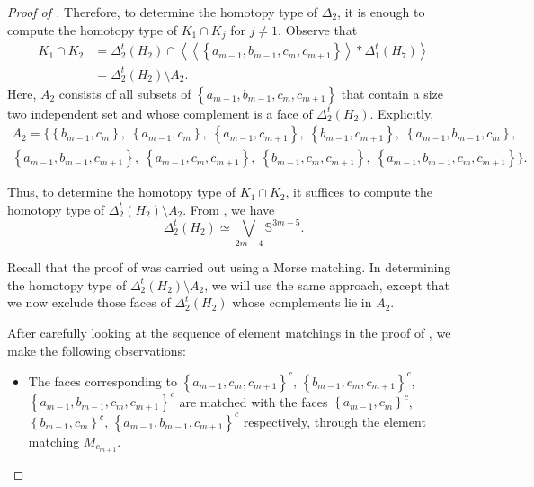 \documentclass[11pt,reqno,a4paper]{amsart}
\theoremstyle{definition}
\theoremstyle{theorem}
\newcommand{\lno}{\left(}
\newcommand{\rno}{\right)}
\newcommand{\lcu}{\left\{}
\newcommand{\rcu}{\right\}}
\newcommand{\bbS}{\mathbb{S}}
\theoremstyle{remark}
\begin{document}
\begin{proof}[Proof of ]
Therefore, to determine the homotopy type of $\Delta_2$, it is enough to compute the homotopy type of $K_1 \cap K_j$ for $j \neq 1$. Observe that
\begin{align*}
    K_1 \cap K_2
        &= \Delta_2^t \lno H_2 \rno
           \cap 
           \left\langle 
               \left\langle 
                   \lcu a_{m-1}, b_{m-1}, c_m, c_{m+1} \rcu 
               \right\rangle 
               * \Delta_1^t \lno H_7 \rno
           \right\rangle \\
        &= \Delta_2^t \lno H_2 \rno \setminus A_2.
\end{align*}
Here, $A_2$ consists of all subsets of $ \lcu a_{m-1}, b_{m-1}, c_m, c_{m+1} \rcu $ that contain a size two independent set and whose complement is a face of $\Delta_2^t \lno H_2 \rno$. Explicitly,
\begin{align*}
    A_2 = \Big\{
        \lcu b_{m-1}, c_m \rcu,\;
         \lcu a_{m-1}, c_m \rcu,\;
         \lcu a_{m-1}, c_{m+1} \rcu,\;
         \lcu b_{m-1}, c_{m+1} \rcu,\;
        \lcu a_{m-1}, b_{m-1}, c_m \rcu,\\
         \lcu a_{m-1}, b_{m-1}, c_{m+1} \rcu,\;
         \lcu a_{m-1}, c_m, c_{m+1} \rcu,\;
        \lcu b_{m-1}, c_m, c_{m+1} \rcu,\;
         \lcu a_{m-1}, b_{m-1}, c_m, c_{m+1} \rcu
    \Big\}.
\end{align*}

Thus, to determine the homotopy type of $K_1 \cap K_2$, it suffices to compute the homotopy type of $\Delta_2^t \lno H_2 \rno \setminus A_2$. From , we have
\[
    \Delta_2^t \lno H_2 \rno \simeq \bigvee\limits_{2m-4} \bbS^{3m-5}.
\]

Recall that the proof of  was carried out using a Morse matching. In determining the homotopy type of $\Delta_2^t \lno H_2 \rno \setminus A_2$, we will use the same approach, except that we now exclude those faces of $\Delta_2^t \lno H_2 \rno$ whose complements lie in $A_2$.

After carefully looking at the sequence of element matchings in the proof of , we make the following observations:
\begin{itemize}
    \item The faces corresponding to $\lcu a_{m-1},c_{m},c_{m+1}\rcu^c$, $\lcu b_{m-1},c_{m},c_{m+1}\rcu^c$, $\lcu a_{m-1},b_{m-1},c_{m},c_{m+1}\rcu^c$ are matched with the faces $\lcu a_{m-1},c_{m}\rcu^c$, $\lcu b_{m-1},c_{m}\rcu^c$, $\lcu a_{m-1},b_{m-1},c_{m+1}\rcu^c$ respectively, through the element matching $M_{c_{m+1}}$.


\end{itemize}
\end{proof}
\end{document}
